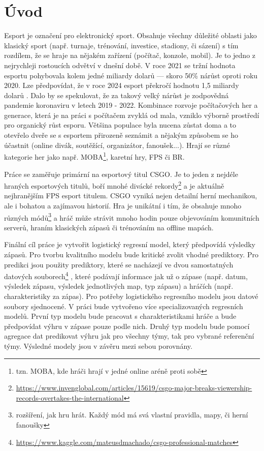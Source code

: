 \chapter{Úvod}
Esport je označení pro elektronický sport. Obsahuje všechny důležité oblasti jako klasický sport (např. turnaje, trénování, investice, stadiony, či sázení)
s tím rozdílem, že se hraje na nějakém zařízení (počítač, konzole, mobil).
Je to jedno z nejrychleji rostoucích odvětví v dnešní době. V roce 2021 se tržní hodnota esportu pohybovala kolem jedné miliardy dolarů --- skoro
50\% nárůst oproti roku 2020. Lze předpovídat, že v roce 2024 esport překročí hodnotu 1,5 miliardy dolarů \cite{Gough2021}.
Dalo by se spekulovat, že za takový velký nárůst je zodpovědná 
{\color{red}
pandemie koronaviru v letech 2019 - 2022. Kombinace rozvoje počítačových her a generace, která je na práci s počítačem zvyklá od mala, vzniklo výborně prostředí
pro organický růst esporu.
}
Většina populace
{\color{red}
byla
} nucena zůstat doma a to otevřelo dveře
se s esportem přirozeně seznámit a nějakým způsobem se ho účastnit (online divák, soutěžící, organizátor, fanoušek...). 
Hrají se různé kategorie her jako např. \ac{MOBA}\footnote{tzn. MOBA, kde hráči hrají v jedné online aréně proti sobě},
karetní hry, \ac{FPS} či \ac{BR}.

Práce se zaměřuje primární na esportový titul \acf{CSGO}. Je to jeden z nejdéle hraných esportových titulů, boří mnohé divácké
rekordy\footnote{\scriptsize \url{https://www.invenglobal.com/articles/15619/csgo-major-breaks-viewership-records-overtakes-the-international}}
a je aktuálně nejhranějším \ac{FPS} esport titulem. \ac{CSGO} vyniká nejen detailní herní mechanikou, ale i bohatou a zajímavou historií. Hra
je unikátní i tím, že obsahuje mnoho různých módů\footnote{rozšíření, jak hru hrát. Každý mód má svá vlastní pravidla, mapy, či herní fanoušky}
a hráč může strávit mnoho hodin pouze objevováním komunitních serverů, hraním klasických zápasů či trénováním na offline mapách.


Finální cíl práce je vytvořit logistický regresní model, který předpovídá výsledky zápasů. Pro tvorbu kvalitního modelu bude kritické zvolit vhodné prediktory.
Pro predikci jsou použity prediktory, které se nacházejí ve dvou samostatných datových souborech\footnote{\url{https://www.kaggle.com/mateusdmachado/csgo-professional-matches}} 
, které podávají informace jak už o zápase (např. datum, výsledek zápasu, výsledek jednotlivých map, typ zápasu) a hráčích 
{\color{red}
(např. charakteristiky za zápas).
Pro potřeby logistického regresního modelu jsou datové soubory sjednocené.
V práci bude vytvořeno více specializovaných regresních modelů. První typ modelu bude pracovat s charakteristikami hráče a bude předpovídat výhru v zápase pouze podle nich.
Druhý typ modelu bude pomocí agregace dat predikovat výhru jak pro všechny týmy, tak pro vybrané referenční týmy.
}
Výsledné modely jsou v závěru mezi sebou porovnány.

